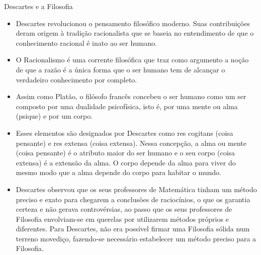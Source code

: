 \documentclass{beamer}
\begin{document}
\begin{frame}
    \begin{block}{Descartes e a Filosofia}
        \begin{itemize}
            \item Descartes revolucionou o pensamento filosófico moderno. Suas contribuições deram origem à tradição racionalista que se baseia no entendimento de que o conhecimento racional é inato ao ser humano. 
            \item O Racionalismo é uma corrente filosófica que traz como argumento a noção de que a razão é a única forma que o ser humano tem de alcançar o verdadeiro conhecimento por completo. 
            \item Assim como Platão, o filósofo francês concebeu o ser humano como um ser composto por uma dualidade psicofísica, isto é, por uma mente ou alma (psique) e por um corpo.
            
        \end{itemize}
    \end{block}  
\end{frame}

\begin{frame}
    \begin{block}{}
        \begin{itemize}
            \item Esses elementos são designados por Descartes como res cogitans (coisa pensante) e res extensa (coisa extensa). Nessa concepção, a alma ou mente (coisa pensante) é o atributo maior do ser humano e o seu corpo (coisa extensa) é a extensão da alma. O corpo depende da alma para viver do mesmo modo que a alma depende do corpo para habitar o mundo.
            \item Descartes observou que os seus professores de Matemática tinham um método preciso e exato para chegarem a conclusões de raciocínios, o que os garantia certeza e não gerava controvérsias, ao passo que os seus professores de Filosofia envolviam-se em querelas por utilizarem métodos próprios e diferentes. Para Descartes, não era possível firmar uma Filosofia sólida num terreno movediço, fazendo-se necessário estabelecer um método preciso para a Filosofia. 
        \end{itemize}
    \end{block}
\end{frame}
\end{document}
